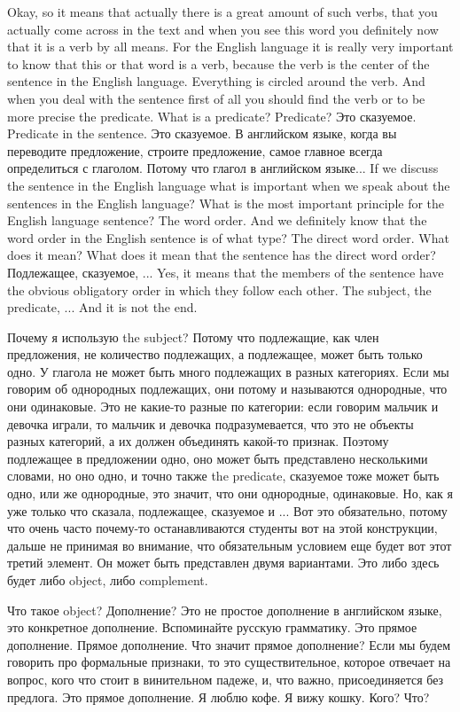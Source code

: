 \documentclass[main.tex]{subfiles}
\begin{document}
Okay, so it means that actually there is a great amount of such verbs, that you actually come across in the text and when you see this word you definitely now that it is a verb by all means.
For the English language it is really very important to know that this or that word is a verb, because the verb is the center of the sentence in the English language.
Everything is circled around the verb.
And when you deal with the sentence first of all you should find the verb or to be more precise the predicate.
What is a predicate? Predicate?
Это сказуемое.
Predicate in the sentence.
Это сказуемое.
В английском языке, когда вы переводите предложение, строите предложение, самое главное всегда определиться с глаголом.
Потому что глагол в английском языке...
If we discuss the sentence in the English language what is important when we speak about the sentences in the English language?
What is the most important principle for the English language sentence?
The word order.
And we definitely know that the word order in the English sentence is of what type?
The direct word order.
What does it mean?
What does it mean that the sentence has the direct word order?
Подлежащее, сказуемое, ...
Yes, it means that the members of the sentence have the obvious obligatory order in which they follow each other.
The subject, the predicate, ... And it is not the end.

Почему я использую the subject?
Потому что подлежащие, как член предложения, не количество подлежащих, а подлежащее, может быть только одно.
У глагола не может быть много подлежащих в разных категориях.
Если мы говорим об однородных подлежащих, они потому и называются однородные, что они одинаковые.
Это не какие-то разные по категории: если говорим мальчик и девочка играли, то мальчик и девочка подразумевается, что это не объекты разных категорий, а их должен объединять какой-то признак.
Поэтому подлежащее в предложении одно, оно может быть представлено несколькими словами, но оно одно, и точно также the predicate, сказуемое тоже может быть одно, или же однородные, это значит, что они однородные, одинаковые.
Но, как я уже только что сказала, подлежащее, сказуемое и ...
Вот это обязательно, потому что очень часто почему-то останавливаются студенты вот на этой конструкции, дальше не принимая во внимание, что обязательным условием еще будет вот этот третий элемент.
Он может быть представлен двумя вариантами.
Это либо здесь будет либо object, либо complement.

Что такое object? Дополнение?
Это не простое дополнение в английском языке, это конкретное дополнение.
Вспоминайте русскую грамматику.
Это прямое дополнение.
Прямое дополнение.
Что значит прямое дополнение?
Если мы будем говорить про формальные признаки, то это существительное, которое отвечает на вопрос, кого что стоит в винительном падеже, и, что важно, присоединяется без предлога.
Это прямое дополнение.
Я люблю кофе.
Я вижу кошку.
Кого? Что?
\end{document}
